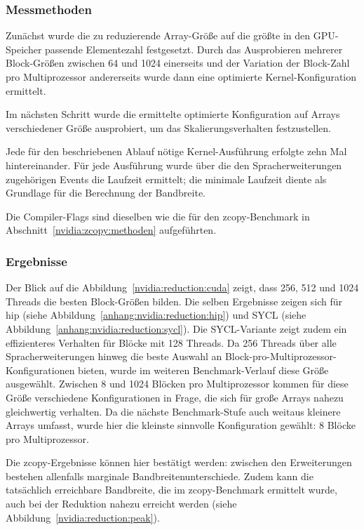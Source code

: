 \subsubsection{Messmethoden}
\label{nvidia:reduction:methoden}

Zunächst wurde die zu reduzierende Array-Größe auf die größte in den
GPU-Speicher passende Elementezahl festgesetzt. Durch das Ausprobieren mehrerer
Block-Größen zwischen \num{64} und \num{1024} einerseits und der Variation der
Block-Zahl pro Multiprozessor andererseits wurde dann eine optimierte
Kernel-Konfiguration ermittelt.

Im nächsten Schritt wurde die ermittelte optimierte Konfiguration auf Arrays
verschiedener Größe ausprobiert, um das Skalierungsverhalten festzustellen.

Jede für den beschriebenen Ablauf nötige Kernel-Ausführung erfolgte zehn Mal
hintereinander. Für jede Ausführung wurde über die den Spracherweiterungen
zugehörigen Events die Laufzeit ermittelt; die minimale Laufzeit diente als
Grundlage für die Berechnung der Bandbreite.

Die Compiler-Flags sind dieselben wie die für den zcopy-Benchmark in
Abschnitt~\ref{nvidia:zcopy:methoden} aufgeführten.

\subsubsection{Ergebnisse}

Der Blick auf die Abbildung~\ref{nvidia:reduction:cuda} zeigt, dass \num{256},
\num{512} und \num{1024} Threads die besten Block-Größen bilden. Die selben
Ergebnisse zeigen sich für \gls{hip} (siehe
Abbildung~\ref{anhang:nvidia:reduction:hip}) und SYCL (siehe
Abbildung~\ref{anhang:nvidia:reduction:sycl}). Die SYCL-Variante zeigt zudem ein
effizienteres Verhalten für Blöcke mit \num{128} Threads.  Da \num{256} Threads
über alle Spracherweiterungen hinweg die beste Auswahl an
Block-pro-Multiprozessor-Konfigurationen bieten, wurde im weiteren
Benchmark-Verlauf diese Größe ausgewählt. Zwischen \num{8} und \num{1024}
Blöcken pro Multiprozessor kommen für diese Größe verschiedene Konfigurationen
in Frage, die sich für große Arrays nahezu gleichwertig verhalten. Da die
nächste Benchmark-Stufe auch weitaus kleinere Arrays umfasst, wurde hier die
kleinste sinnvolle Konfiguration gewählt: \num{8} Blöcke pro Multiprozessor. 

Die zcopy-Ergebnisse können hier bestätigt werden: zwischen den Erweiterungen
bestehen allenfalls marginale Bandbreitenunterschiede. Zudem kann die
tatsächlich erreichbare Bandbreite, die im zcopy-Benchmark ermittelt wurde,
auch bei der Reduktion nahezu erreicht werden (siehe
Abbildung~\ref{nvidia:reduction:peak}).


